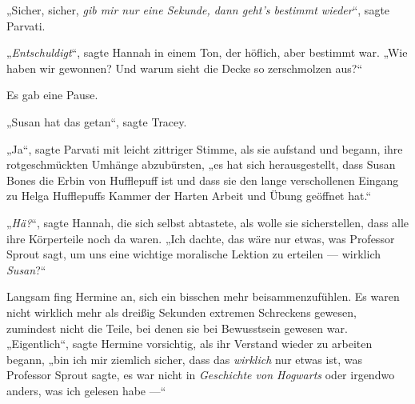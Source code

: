 „Sicher, sicher, \emph{gib mir nur eine Sekunde, dann geht’s bestimmt wieder}“, sagte Parvati.

„\emph{Entschuldigt}“, sagte Hannah in einem Ton, der höflich, aber bestimmt war.
„Wie haben wir gewonnen? Und warum sieht die Decke so zerschmolzen aus?“

Es gab eine Pause.

„Susan hat das getan“, sagte Tracey.

„Ja“, sagte Parvati mit leicht zittriger Stimme, als sie aufstand und begann, ihre rotgeschmückten Umhänge abzubürsten, „es hat sich herausgestellt, dass Susan Bones die Erbin von Hufflepuff ist und dass sie den lange verschollenen Eingang zu Helga Hufflepuffs Kammer der Harten Arbeit und Übung geöffnet hat.“

„\emph{Hä?}“, sagte Hannah, die sich selbst abtastete, als wolle sie sicherstellen, dass alle ihre Körperteile noch da waren.
„Ich dachte, das wäre nur etwas, was Professor Sprout sagt, um uns eine wichtige moralische Lektion zu erteilen — wirklich \emph{Susan}?“

Langsam fing Hermine an, sich ein bisschen mehr beisammenzufühlen. Es waren nicht wirklich mehr als dreißig Sekunden extremen Schreckens gewesen, zumindest nicht die Teile, bei denen sie bei Bewusstsein gewesen war.
„Eigentlich“, sagte Hermine vorsichtig, als ihr Verstand wieder zu arbeiten begann, „bin ich mir ziemlich sicher, dass das \emph{wirklich} nur etwas ist, was Professor Sprout sagte, es war nicht in \emph{Geschichte von Hogwarts} oder irgendwo anders, was ich gelesen habe —“

